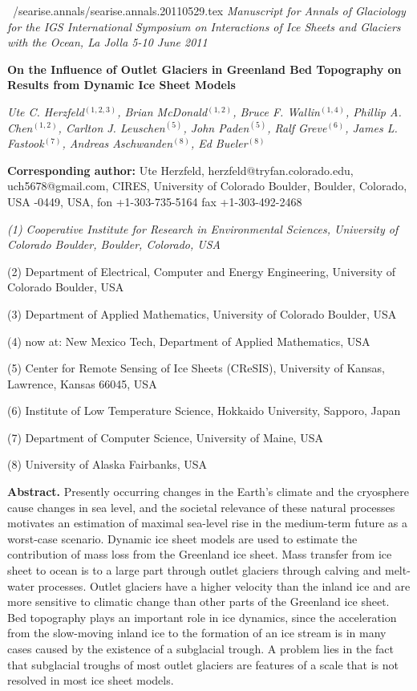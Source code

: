 \documentclass[11pt]{article}
\begin{document}
\hfill ~/searise.annals/searise.annals.20110529.tex\break 
{\it Manuscript for Annals of Glaciology for the IGS International Symposium on Interactions of Ice Sheets and Glaciers with the Ocean,
La Jolla 5-10 June 2011}


\bs
\bs
{\bf On the Influence of Outlet Glaciers in Greenland Bed Topography
on Results from Dynamic Ice Sheet Models}
\bs

{\it Ute C. Herzfeld$^{(1,2,3)}$, Brian McDonald$^{(1,2)}$, Bruce F. Wallin$^{(1,4)}$, Phillip A. Chen$^{(1,2)}$,
Carlton J. Leuschen$^{(5)}$, John Paden$^{(5)}$, 
Ralf Greve$^{(6)}$, James L. Fastook$^{(7)}$, Andreas Aschwanden$^{(8)}$, Ed Bueler$^{(8)}$


}

{\bf Corresponding author:} Ute Herzfeld, herzfeld@tryfan.colorado.edu, uch5678@gmail.com,\nl
CIRES, University of Colorado Boulder, Boulder, Colorado, USA -0449, USA, 
 fon +1-303-735-5164\nl
 fax +1-303-492-2468\nl


{\it
(1) Cooperative Institute for Research in Environmental Sciences, University of Colorado Boulder, Boulder, Colorado, USA 

(2) Department of Electrical, Computer and Energy Engineering,  University of Colorado Boulder, USA

(3) Department of Applied Mathematics, University of Colorado Boulder, USA

(4) now at: New Mexico Tech, Department of Applied Mathematics, USA

(5)  Center for Remote Sensing of Ice Sheets (CReSIS), University of Kansas, Lawrence, Kansas 66045, USA

(6) Institute of Low Temperature Science,  Hokkaido University, Sapporo, Japan

(7) Department of Computer Science, University of Maine, USA

(8) University of Alaska Fairbanks, USA
}


\bs
{\bf Abstract.}
Presently occurring changes in the Earth's climate and the cryosphere cause changes
in sea level, and the societal relevance of these natural processes motivates an estimation of maximal sea-level rise in the medium-term future as a worst-case scenario. Dynamic ice sheet models are used to estimate the contribution
of mass loss from the Greenland ice sheet. 
Mass transfer from ice sheet to ocean is to a large part through outlet glaciers through calving and melt-water processes.
Outlet glaciers have a higher velocity than the inland ice and 
 are more sensitive to climatic change than other parts of the 
Greenland ice sheet.
Bed topography plays an important role in ice dynamics,
since the acceleration from the slow-moving inland ice to the formation of an ice stream is in many cases caused by
the existence of a subglacial trough.
A problem lies in the fact that subglacial troughs of most outlet glaciers are features of a scale that is not
resolved in most ice sheet models. 
\end{document}
